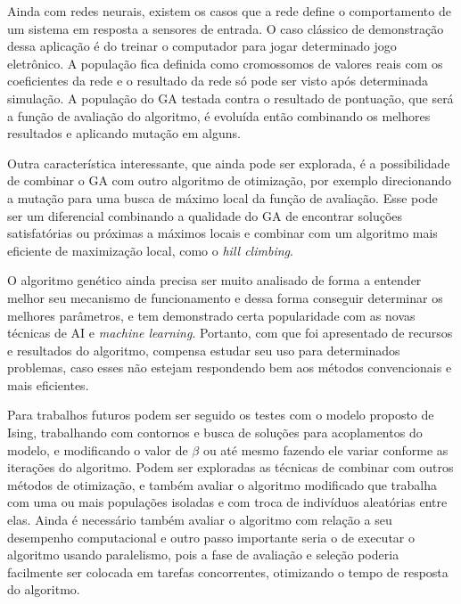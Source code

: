\documentclass[
	12pt,				%
	openright,			%
	twoside,			%
	a4paper,			%
	english,			%
	brazil				%
	]{abntex2}
\begin{document}
Ainda com redes neurais, existem os casos que a rede define o comportamento de um sistema em resposta a sensores de entrada. O caso clássico de demonstração dessa aplicação é do treinar o computador para jogar determinado jogo eletrônico. A população fica definida como cromossomos de valores reais com os coeficientes da rede e o resultado da rede só pode ser visto após determinada simulação. A população do GA testada contra o resultado de pontuação, que será a função de avaliação do algoritmo, é evoluída então combinando os melhores resultados e aplicando mutação em alguns.

Outra característica interessante, que ainda pode ser explorada, é a possibilidade de combinar o GA com outro algoritmo de otimização, por exemplo direcionando a mutação para uma busca de máximo local da função de avaliação. Esse pode ser um diferencial combinando a qualidade do GA de encontrar soluções satisfatórias ou próximas a máximos locais e combinar com um algoritmo mais eficiente de maximização local, como o \textit{hill climbing}.

O algoritmo genético ainda precisa ser muito analisado de forma a entender melhor seu mecanismo de funcionamento e dessa forma conseguir determinar os melhores parâmetros, e tem demonstrado certa popularidade com as novas técnicas de AI e \textit{machine learning}. Portanto, com que foi apresentado de recursos e resultados do algoritmo, compensa estudar seu uso para determinados problemas, caso esses não estejam respondendo bem aos métodos convencionais e mais eficientes.

Para trabalhos futuros podem ser seguido os testes com o modelo proposto de Ising, trabalhando com contornos e busca de soluções para acoplamentos do modelo, e modificando o valor de \(\beta\) ou até mesmo fazendo ele variar conforme as iterações do algoritmo. Podem ser exploradas as técnicas de combinar com outros métodos de otimização, e também avaliar o algoritmo modificado que trabalha com uma ou mais populações isoladas e com troca de indivíduos aleatórias entre elas. Ainda é necessário também avaliar o algoritmo com relação a seu desempenho computacional e outro passo importante seria o de executar o algoritmo usando paralelismo, pois a fase de avaliação e seleção poderia facilmente ser colocada em tarefas concorrentes, otimizando o tempo de resposta do algoritmo.


\postextual
\end{document}
